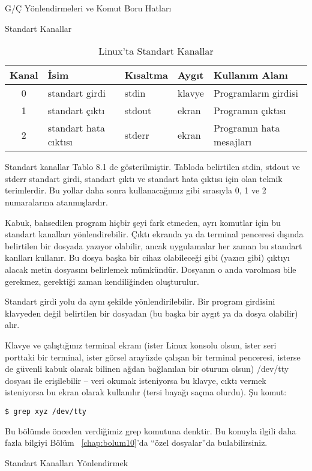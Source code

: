 \begin{section}{G/Ç Yönlendirmeleri ve Komut Boru Hatları}
\begin{subsection}{Standart Kanallar}
\begin {table}[htb]
\caption {Linux'ta Standart Kanallar} \label{tab:8.1}
\begin{tabular}{c l l l l}
\hline
Kanal & İsim & Kısaltma & Aygıt & Kullanım Alanı\\
\hline
0	& standart girdi &		stdin	&	klavye	&   Programların girdisi\\
1	&standart çıktı&      	stdout&		ekran&	   Programın çıktısı\\
2 	&standart hata cıktısı  &       stderr	&	ekran	&   Programın hata mesajları \\
\hline
\end{tabular}
\end {table}

Standart kanallar Tablo 8.1 de gösterilmiştir. Tabloda belirtilen stdin, stdout ve stderr standart girdi, standart çıktı ve standart hata çıktısı için olan teknik terimlerdir. Bu yollar daha sonra kullanacağımız gibi sırasıyla 0, 1 ve 2 numaralarına atanmışlardır.

Kabuk, bahsedilen program hiçbir şeyi fark etmeden, ayrı komutlar için bu standart kanalları yönlendirebilir. Çıktı ekranda ya da terminal penceresi dışında belirtilen bir dosyada yazıyor olabilir, ancak uygulamalar her zaman bu standart kanlları kullanır. Bu dosya başka bir cihaz olabileceği gibi (yazıcı gibi) çıktıyı alacak metin dosyasını belirlemek mümkündür. Dosyanın o anda varolması bile gerekmez, gerektiği zaman kendiliğinden oluşturulur.

Standart girdi yolu da aynı şekilde yönlendirilebilir. Bir program girdisini klavyeden değil belirtilen bir dosyadan (bu başka bir aygıt ya da dosya olabilir) alır.

Klavye ve çalıştığınız terminal ekranı (ister Linux konsolu olsun, ister seri porttaki bir terminal, ister görsel arayüzde çalışan bir terminal penceresi, isterse de güvenli kabuk olarak bilinen ağdan bağlanılan bir oturum olsun) /dev/tty dosyası ile erişilebilir – veri okumak isteniyorsa bu klavye, cıktı vermek isteniyorsa bu ekran olarak kullanılır (tersi bayağı saçma olurdu). Şu komut:
\begin{verbatim}
$ grep xyz /dev/tty
\end{verbatim}

Bu bölümde önceden verdiğimiz grep komutuna denktir. Bu konuyla ilgili daha fazla bilgiyi Bölüm ~\ref{chap:bolum10}'da “özel dosyalar”da bulabilirsiniz.
\end{subsection}
\begin{subsection}{Standart Kanalları Yönlendirmek}


\end{subsection}
\end{section}
